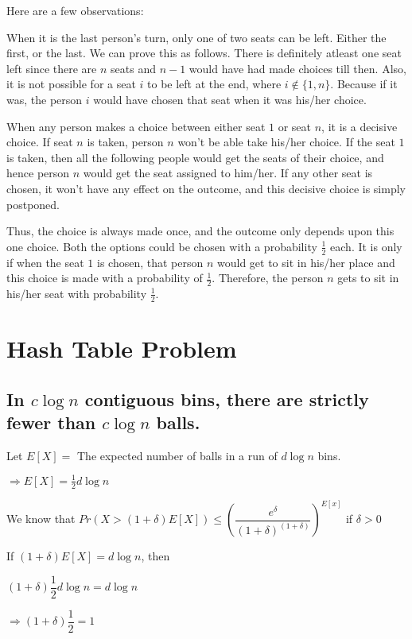 \documentclass{article}
\begin{document}
Here are a few observations: 

When it is the last person's turn, only one of two seats can be left. 
Either the first, or the last. We can prove this as follows. There is definitely 
atleast one seat left since there are $n$ seats and $n-1$ would have had made 
choices till then. Also, it is not possible for a seat $i$ to be
left at the end, where $i \notin  \{ 1, n \}$. Because if it was, the person $i$ would
have chosen that seat when it was his/her choice. 

When any person makes a choice between either seat $1$ or seat $n$, it is a decisive choice.
If seat $n$ is taken, person $n$ won't be able take his/her choice. If the seat
$1$ is taken, then all the following people would get the seats of their choice, and
hence person $n$ would get the seat assigned to him/her. If any other seat is 
chosen, it won't have any effect on the outcome, and this decisive choice
is simply postponed. 

Thus, the choice is always made once, and the outcome only depends upon this one
choice. Both the options could be chosen with a probability $\frac{1}{2}$ each. It is
only if when the seat $1$ is chosen, that person $n$ would get to sit in his/her place
and this choice is made with a probability of $\frac{1}{2}$. Therefore, the person
$n$ gets to sit in his/her seat with probability $\frac{1}{2}$. 


\clearpage

\section{Hash Table Problem}
\subsection{In $c\log{n}$ contiguous bins, there are strictly
fewer than $c\log{n}$ balls.}

Let $E[X] =$ The expected number of balls in a run of $d\log{n}$ bins.

$\Rightarrow E[X] = \frac{1}{2}d\log{n}$

We know that $Pr(X > (1+\delta)E[X]) \le \left( \dfrac{e^\delta}{(1+\delta)^{(1+\delta)}} \right)^{E[x]}$ if $\delta > 0$

If $(1+\delta)E[X] = d\log{n}$, then

$(1+\delta)\dfrac{1}{2}d\log{n} = d\log{n}$

$\Rightarrow (1+\delta)\dfrac{1}{2} = 1$
\end{document}
